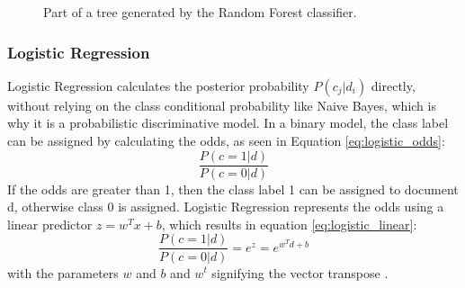         \begin{figure}[h!]
        \centering
    \caption{Part of a tree generated by the Random Forest classifier.}
      \label{fig:tree}
\end{figure}
\subsubsection{Logistic Regression}
Logistic Regression calculates the posterior probability $P(c_j|d_i)$ directly, without relying on the class conditional probability like Naive Bayes, which is why it is a probabilistic discriminative model. In a binary model, the class label can be assigned by calculating the odds, as seen in Equation \eqref{eq:logistic_odds}:
        \begin{equation}
            \label{eq:logistic_odds}
                \frac{P(c=1|d)}{P(c=0|d)}
        \end{equation}
If the odds are greater than 1, then the class label 1 can be assigned to document d, otherwise class 0 is assigned. Logistic Regression represents the odds using a linear predictor $z=w^Tx + b$, which results in equation \eqref{eq:logistic_linear}:
        \begin{equation}
            \label{eq:logistic_linear}
                \frac{P(c=1|d)}{P(c=0|d)} = e^z = e^{w^Td+b}
        \end{equation}
with the parameters $w$ and $b$ and $w^t$ signifying the vector transpose \cite{DBLP:books/aw/TanSKK2019}.

